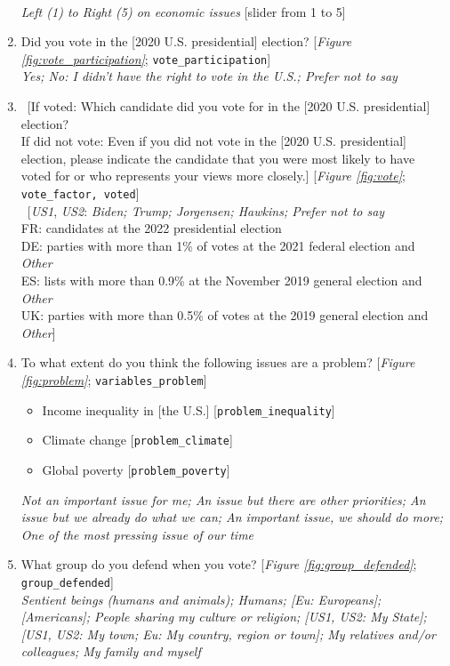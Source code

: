 \begin{enumerate}[resume]
\\ \textit{Left (1) to Right (5) on economic issues} [slider from 1 to 5]
\item  \label{q:vote_participation} Did you vote in the [2020 U.S. presidential] election?  [\textit{Figure \ref{fig:vote_participation}}; \verb|vote_participation|]
\\ \textit{Yes; No: I didn't have the right to vote in the U.S.; Prefer not to say}
\item  \label{q:vote} ~[If voted: Which candidate did you vote for in the [2020 U.S. presidential] election? \\ If did not vote: Even if you did not vote in the [2020 U.S. presidential] election, please indicate the candidate that you were most likely to have voted for or who represents your views more closely.] [\textit{Figure \ref{fig:vote}}; \verb|vote_factor, voted|]
\\ ~[\textit{US1}, \textit{US2}: \textit{Biden; Trump; Jorgensen; Hawkins; Prefer not to say}\\ FR: candidates at the 2022 presidential election\\ DE: parties with more than 1\% of votes at the 2021 federal election and \textit{Other}\\ ES: lists with more than 0.9\% at the November 2019 general election and \textit{Other}\\ UK: parties with more than 0.5\% of votes at the 2019 general election and \textit{Other}]
\item  \label{q:problem} To what extent do you think the following issues are a problem? [\textit{Figure \ref{fig:problem}}; \verb|variables_problem|]
\begin{itemize}
    \item  Income inequality in [the U.S.] [\verb|problem_inequality|]
    \item  Climate change [\verb|problem_climate|]
    \item  Global poverty [\verb|problem_poverty|]
\end{itemize}
\textit{Not an important issue for me; An issue but there are other priorities; An issue but we already do what we can; An important issue, we should do more; One of the most pressing issue of our time}
\item  \label{q:group_defended} What group do you defend when you vote? [\textit{Figure \ref{fig:group_defended}}; \verb|group_defended|]
\\ \textit{Sentient beings (humans and animals); Humans; [\textit{Eu}: Europeans]; [Americans]; People sharing my culture or religion; [\textit{US1}, US2: My State]; [\textit{US1}, US2: My town; \textit{Eu}: My country, region or town]; My relatives and/or colleagues; My family and myself}
\end{enumerate}


